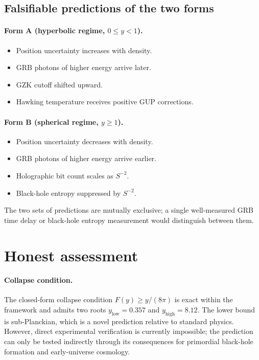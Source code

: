 \documentclass[a4paper,7pt,oneside,openany]{book}
\begin{document}
\subsection{Falsifiable predictions of the two forms}

\paragraph{Form A (hyperbolic regime, $0\le y<1$).}
\begin{itemize}
\item Position uncertainty increases with density.
\item GRB photons of higher energy arrive later.
\item GZK cutoff shifted upward.
\item Hawking temperature receives positive GUP corrections.
\end{itemize}

\paragraph{Form B (spherical regime, $y\ge 1$).}
\begin{itemize}
\item Position uncertainty decreases with density.
\item GRB photons of higher energy arrive earlier.
\item Holographic bit count scales as $S^{-2}$.
\item Black-hole entropy suppressed by $S^{-2}$.
\end{itemize}

The two sets of predictions are mutually exclusive; a single 
well-measured GRB time delay or black-hole entropy measurement 
would distinguish between them.

\section{Honest assessment}

\paragraph{Collapse condition.}
The closed-form collapse condition $F(y)\geq y/(8\pi)$ is exact 
within the framework and admits two roots $y_{\text{low}}=0.357$ 
and $y_{\text{high}}=8.12$. The lower bound is sub-Planckian, 
which is a novel prediction relative to standard physics. 
However, direct experimental verification is currently 
impossible; the prediction can only be tested indirectly 
through its consequences for primordial black-hole formation 
and early-universe cosmology.
\end{document}
